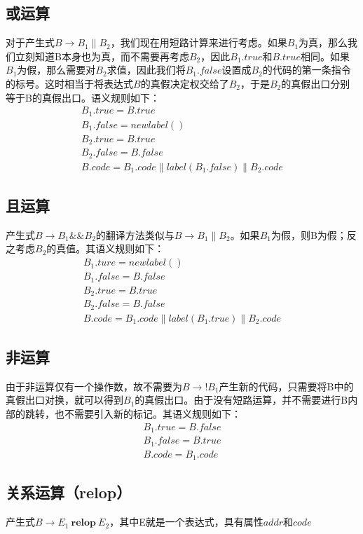 \documentclass[]{report}
\begin{document}
		\subsection{或运算}
			对于产生式$B\to B_1\parallel B_2$，我们现在用短路计算来进行考虑。如果$B_1$为真，那么我们立刻知道B本身也为真，而不需要再考虑$B_2$，因此$B_1.true$和$B.true$相同。如果$B_1$为假，那么需要对$B_2$求值，因此我们将$B_1.false$设置成$B_2$的代码的第一条指令的标号。这时相当于将表达式$B$的真假决定权交给了$B_2$，于是$B_2$的真假出口分别等于B的真假出口。语义规则如下：\
			\[\begin{gathered}
				B_1.true = B.true\\
				B_1.false = newlabel()\\
				B_2.true = B.true\\
				B_2.false = B.false\\
				B.code = B_1.code\parallel label(B_1.false)\parallel B_2.code
			\end{gathered}\]
		\subsection{且运算}
			产生式$B\to B_1\&\&B_2$的翻译方法类似与$B\to B_1\parallel B_2$。如果$B_1$为假，则B为假；反之考虑$B_2$的真值。其语义规则如下：
			\[\begin{gathered}
				B_1.ture = newlabel()\\
				B_1.false = B.false\\
				B_2.true = B.true\\
				B_2.false = B.false\\
				B.code = B_1.code\parallel label(B_1.true)\parallel B_2.code
			\end{gathered}\]
		\subsection{非运算}
			由于非运算仅有一个操作数，故不需要为$B\to!B_1$产生新的代码，只需要将B中的真假出口对换，就可以得到$B_1$的真假出口。由于没有短路运算，并不需要进行B内部的跳转，也不需要引入新的标记。其语义规则如下：
			\[\begin{gathered}
				B_1.true = B.false\\
				B_1.false = B.true\\
				B.code = B_1.code
			\end{gathered}\]
		\subsection{关系运算（relop）}
			产生式$B\to E_1\ \mathbf{relop}\ E_2$，其中E就是一个表达式，具有属性$addr$和$code$
\end{document}
